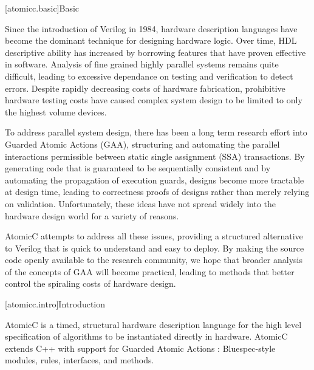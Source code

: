 [atomicc.basic]{Basic}

Since the introduction of Verilog in 1984, hardware description languages have
become the dominant technique for designing hardware logic.  Over time,
HDL descriptive ability has increased by borrowing features that have proven
effective in software.
Analysis of fine grained highly parallel systems remains quite difficult,
leading to excessive dependance on testing and verification to detect errors.
Despite rapidly decreasing costs of hardware fabrication,
prohibitive hardware testing costs have caused complex system design
to be limited to only the highest volume devices.

To address parallel system design,
there has been a long term research effort into Guarded Atomic Actions (GAA),
structuring and automating the parallel interactions permissible between static single assignment (SSA)
transactions.
By generating code that is guaranteed to be sequentially consistent and by automating
the propagation of execution guards, designs become more tractable at design time, leading
to correctness proofs of designs rather than merely relying on validation.
Unfortunately, these ideas have not spread widely into the hardware design world for a variety of reasons.

AtomicC attempts to address all these issues, providing a structured alternative to Verilog
that is quick to understand and easy to deploy.  By making the source code openly available
to the research community, we hope that broader analysis of the concepts of GAA will become
practical, leading to methods that better control the spiraling costs of hardware design.

[atomicc.intro]{Introduction}

AtomicC is a timed, structural hardware description language for
the high level specification of algorithms to be instantiated
directly in hardware.
AtomicC extends C++
with support for Guarded Atomic Actions
\cite{Hoe:Thesis,HoeArvind:TRSSynthesis2,Dave2007}:
Bluespec-style\cite{Bluespec:www}
modules, rules, interfaces, and methods.

